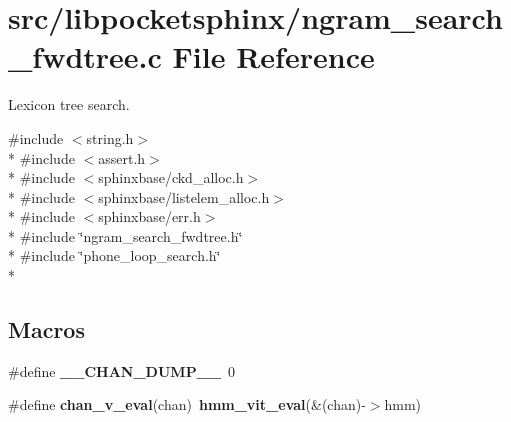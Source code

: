 \section{src/libpocketsphinx/ngram\+\_\+search\+\_\+fwdtree.c File Reference}
\label{ngram__search__fwdtree_8c}


Lexicon tree search.  


{\ttfamily \#include $<$string.\+h$>$}\\*
{\ttfamily \#include $<$assert.\+h$>$}\\*
{\ttfamily \#include $<$sphinxbase/ckd\+\_\+alloc.\+h$>$}\\*
{\ttfamily \#include $<$sphinxbase/listelem\+\_\+alloc.\+h$>$}\\*
{\ttfamily \#include $<$sphinxbase/err.\+h$>$}\\*
{\ttfamily \#include \char`\"{}ngram\+\_\+search\+\_\+fwdtree.\+h\char`\"{}}\\*
{\ttfamily \#include \char`\"{}phone\+\_\+loop\+\_\+search.\+h\char`\"{}}\\*
\subsection*{Macros}
\begin{DoxyCompactItemize}
\item 
\#define {\bfseries \+\_\+\+\_\+\+C\+H\+A\+N\+\_\+\+D\+U\+M\+P\+\_\+\+\_\+}~0\label{ngram__search__fwdtree_8c_a58360b0a332f35742f89edce94c649aa}

\item 
\#define {\bfseries chan\+\_\+v\+\_\+eval}(chan)~{\bf hmm\+\_\+vit\+\_\+eval}(\&(chan)-\/$>$hmm)\label{ngram__search__fwdtree_8c_a268c1fbc6483e1ab06c007222f08d9ad}

\end{DoxyCompactItemize}
